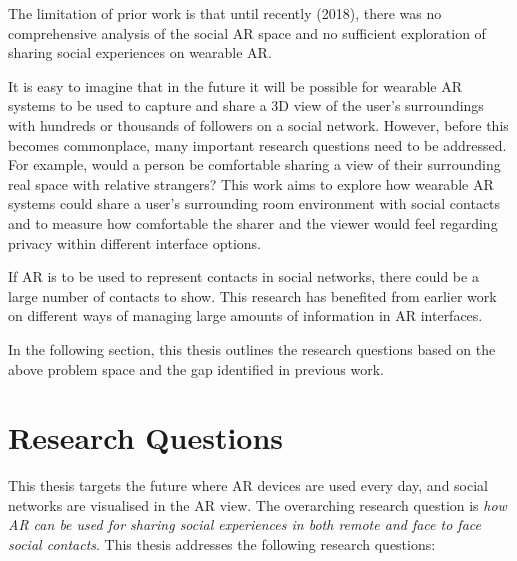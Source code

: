 The limitation of prior work is that until recently (2018), there was no comprehensive analysis of the social AR space and no sufficient exploration of sharing social experiences on wearable AR. 

It is easy to imagine that in the future it will be possible for wearable AR systems to be used to capture and share a 3D view of the user's surroundings with hundreds or thousands of followers on a social network. However, before this becomes commonplace, many important research questions need to be addressed. For example, would a person be comfortable sharing a view of their surrounding real space with relative strangers? This work aims to explore how wearable AR systems could share a user's surrounding room environment with social contacts and to measure how comfortable the sharer and the viewer would feel regarding privacy within different interface options. 

If AR is to be used to represent contacts in social networks, there could be a large number of contacts to show. This research has benefited from earlier work on different ways of managing large amounts of information in AR interfaces.

In the following section, this thesis outlines the research questions based on the above problem space and the gap identified in previous work.

\section{Research Questions}

This thesis targets the future where AR devices are used every day, and social networks are visualised in the AR view. The overarching research question is \textit{how AR can be used for sharing social experiences in both remote and face to face social contacts}. This thesis addresses the following research questions: 

